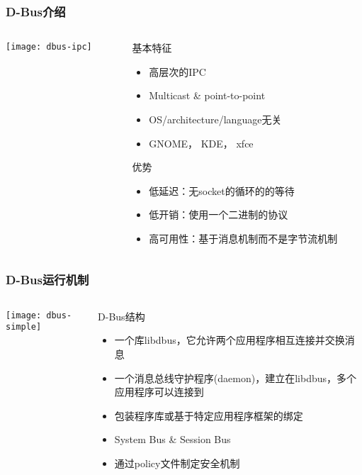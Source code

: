\begin{frame}[fragile]
	\frametitle{D-Bus介绍}
	
	\begin{columns}
		\begin{column}{.4\textwidth}
			
			\texttt{[image: dbus-ipc]}
			
		\end{column}
		\begin{column}{.6\textwidth}
			基本特征
			\begin{itemize}
				\item 高层次的IPC
				\item Multicast \& point-to-point
				\item OS/architecture/language无关
				\item GNOME， KDE， xfce
			\end{itemize}
			优势
			\begin{itemize}
				\item 低延迟：无socket的循环的的等待
				\item 低开销：使用一个二进制的协议
				\item 高可用性：基于消息机制而不是字节流机制
			\end{itemize}
		\end{column}
	\end{columns}
\end{frame}
\begin{frame}[fragile]
	\frametitle{D-Bus运行机制}
	
	\begin{columns}
		\begin{column}{.4\textwidth}
			
			\texttt{[image: dbus-simple]}
			
		\end{column}
		\begin{column}{.6\textwidth}
			D-Bus结构
			\begin{itemize}
				\item 一个库libdbus，它允许两个应用程序相互连接并交换消息
				\item 一个消息总线守护程序(daemon)，建立在libdbus，多个应用程序可以连接到
				\item 包装程序库或基于特定应用程序框架的绑定
				\item System Bus \& Session Bus
				\item 通过policy文件制定安全机制

			\end{itemize}
		\end{column}
	\end{columns}
\end{frame}

